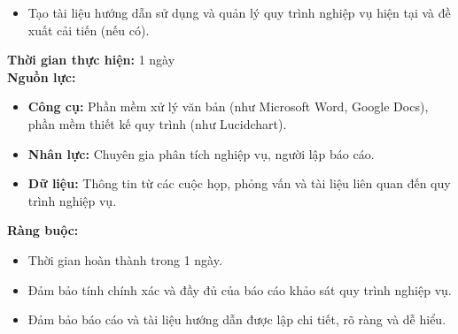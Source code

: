 {\begin{minipage}{\textwidth}
\begin{itemize}
        \item Tạo tài liệu hướng dẫn sử dụng và quản lý quy trình nghiệp vụ hiện tại và đề xuất cải tiến (nếu có).
    \end{itemize}
    \vspace{0.5cm}
    \noindent \textbf{Thời gian thực hiện:} 1 ngày \\
    \noindent \textbf{Nguồn lực:}
    \begin{itemize}
        \item \textbf{Công cụ:} Phần mềm xử lý văn bản (như Microsoft Word, Google Docs), phần mềm thiết kế quy trình (như Lucidchart).
        \item \textbf{Nhân lực:} Chuyên gia phân tích nghiệp vụ, người lập báo cáo.
        \item \textbf{Dữ liệu:} Thông tin từ các cuộc họp, phỏng vấn và tài liệu liên quan đến quy trình nghiệp vụ.
    \end{itemize}
    \vspace{0.5cm}
    \noindent \textbf{Ràng buộc:}
    \begin{itemize}
        \item Thời gian hoàn thành trong 1 ngày.
        \item Đảm bảo tính chính xác và đầy đủ của báo cáo khảo sát quy trình nghiệp vụ.
        \item Đảm bảo báo cáo và tài liệu hướng dẫn được lập chi tiết, rõ ràng và dễ hiểu.
    \end{itemize}
    \end{minipage}
}

\newpage %

% 
